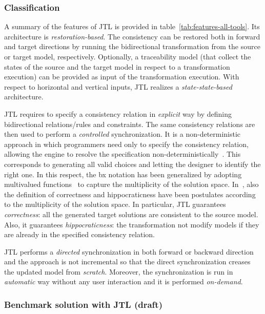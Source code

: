 \subsubsection{Classification}
A summary of the features of JTL is provided in table~\ref{tab:features-all-tools}. Its architecture is \emph{restoration-based}.
%
The consistency can be restored both in forward and target directions by running the bidirectional transformation from the source or target model, respectively. Optionally, a traceability model (that collect the  states of the source and the target model in respect to a transformation execution) can be provided as input of the transformation execution. 
%
With respect to horizontal and vertical inputs, JTL realizes a \emph{state-state-based} architecture.

JTL requires to specify a consistency relation in \emph{explicit} way by defining bidirectional relations/rules and constraints. The same consistency relations are then used to perform a \emph{controlled} synchronization. It is a non-deterministic approach in which programmers need only to specify the consistency relation, allowing the engine to resolve the specification non-deterministically~\cite{monads}. This corresponds to generating all valid choices and letting the designer to identify the right one. In this respect, the bx notation has been generalized by adopting multivalued functions~\cite{EPR15} to capture the multiplicity of the solution space. In~\cite{EPR15}, also the definition of correctness and hippocraticness have been postulates according to the multiplicity of the solution space. In particular, JTL guarantees
\emph{correctness}: all the generated target solutions are consistent to the source model. Also, it guarantees \emph{hippocraticness}: the transformation not modify models if they are already in the specified consistency relation. 

JTL performs a \emph{directed} synchronization in both forward or backward direction and the approach is not incremental so that the direct synchronization creases the updated model from \emph{scratch}. Moreover, the synchronization is run in \emph{automatic} way without any user interaction and it is performed \emph{on-demand}.  



\subsubsection{Benchmark solution with JTL (draft)}


